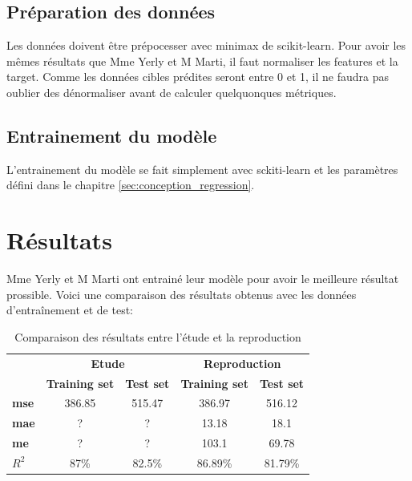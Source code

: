 \subsection{Préparation des données}
Les données doivent être prépocesser avec \acrshort{minimax} de scikit-learn.
Pour avoir les mêmes résultats que Mme Yerly et M Marti, il faut normaliser les features et la target.
Comme les données cibles prédites seront entre 0 et 1, il ne faudra pas oublier des dénormaliser avant de calculer quelquonques métriques.

\subsection{Entrainement du modèle}
L'entrainement du modèle se fait simplement avec sckiti-learn et les paramètres défini dans le chapitre \ref{sec:conception_regression}.


\section{Résultats}
Mme Yerly et M Marti ont entrainé leur modèle pour avoir le meilleure résultat prossible.
Voici une comparaison des résultats obtenus avec les données d'entraînement et de test:

\begin{table}[ht]
    \centering
    \begin{tabular}{l|cc|cc|}
    \cline{2-5}
    \multicolumn{1}{c|}{}              & \multicolumn{2}{c|}{\textbf{Etude}}                            & \multicolumn{2}{c|}{\textbf{Reproduction}}                     \\
    \multicolumn{1}{c|}{\textbf{}}     & \multicolumn{1}{c|}{\textbf{Training set}} & \textbf{Test set} & \multicolumn{1}{c|}{\textbf{Training set}} & \textbf{Test set} \\ \hline
    \multicolumn{1}{|l|}{\textbf{\acrshort{mse}}} & \multicolumn{1}{c|}{386.85}                & 515.47            & \multicolumn{1}{c|}{386.97}                & 516.12            \\ \hline
    \multicolumn{1}{|l|}{\textbf{\acrshort{mae}}} & \multicolumn{1}{c|}{?}                     & ?                 & \multicolumn{1}{c|}{13.18}                 & 18.1              \\ \hline
    \multicolumn{1}{|l|}{\textbf{\acrshort{me}}}  & \multicolumn{1}{c|}{?}                     & ?                 & \multicolumn{1}{c|}{103.1}                 & 69.78             \\ \hline
    \multicolumn{1}{|l|}{\textbf{$R^2$}}   & \multicolumn{1}{c|}{87\%}                  & 82.5\%            & \multicolumn{1}{c|}{86.89\%}               & 81.79\%           \\ \hline
    \end{tabular}%
    \caption{Comparaison des résultats entre l'étude et la reproduction}
\end{table}

